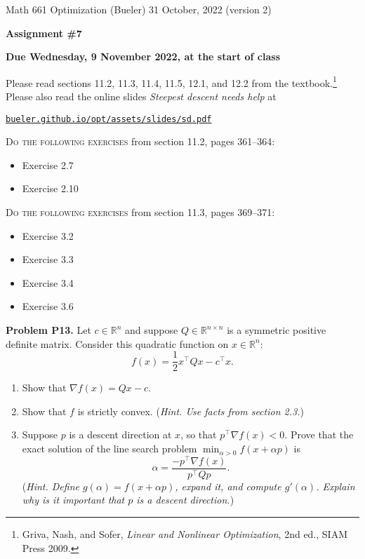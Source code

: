 \documentclass[12pt]{amsart}
\newcommand{\RR}{\mathbb{R}}
\newcommand{\grad}{\nabla}
\newcommand{\prob}[1]{\bigskip\noindent\textbf{#1}\quad }
\begin{document}
\scriptsize \noindent Math 661 Optimization (Bueler) \hfill 31 October, 2022 (version 2)
\normalsize

\medskip\bigskip

\Large\centerline{\textbf{Assignment \#7}}
\large
\bigskip

\centerline{\textbf{Due Wednesday, 9 November 2022, at the start of class}}
\bigskip
\normalsize

\thispagestyle{empty}

\bigskip
Please read sections 11.2, 11.3, 11.4, 11.5, 12.1, and 12.2 from the textbook.\footnote{Griva, Nash, and Sofer, \emph{Linear and Nonlinear Optimization}, 2nd ed., SIAM Press 2009.}  Please also read the online slides \emph{Steepest descent needs help} at

  \centerline{\href{https://bueler.github.io/opt/assets/slides/sd.pdf}{\texttt{bueler.github.io/opt/assets/slides/sd.pdf}}}

\bigskip
\noindent \textsc{Do the following exercises} from section 11.2, pages 361--364:

\begin{itemize}
\item Exercise 2.7
\item Exercise 2.10
\end{itemize}

\bigskip
\noindent \textsc{Do the following exercises} from section 11.3, pages 369--371:

\begin{itemize}
\item Exercise 3.2
\item Exercise 3.3
\item Exercise 3.4
\item Exercise 3.6
\end{itemize}


\prob{Problem P13.}  Let $c\in\RR^n$ and suppose $Q\in \RR^{n\times n}$ is a symmetric positive definite matrix.  Consider this quadratic function on $x\in\RR^n$:
\begin{equation}
    f(x) = \frac{1}{2} x^\top Q x - c^\top x.   \label{quad}
\end{equation}

\medskip
\renewcommand{\labelenumi}{\textbf{\alph{enumi})}}
\begin{enumerate}
\item Show that $\grad f(x) = Q x - c$.
\item Show that $f$ is strictly convex.  (\emph{Hint.  Use facts from section 2.3.})
\item Suppose $p$ is a descent direction at $x$, so that $p^\top \grad f(x)<0$.  Prove that the exact solution of the line search problem $\min_{\alpha>0} f(x+\alpha p)$ is
    $$\alpha = \frac{-p^\top \grad f(x)}{p^\top Q p}.$$
(\emph{Hint.  Define $g(\alpha)=f(x+\alpha p)$, expand it, and compute $g'(\alpha)$.  Explain why is it important that $p$ is a descent direction.})
\end{enumerate}
\end{document}

